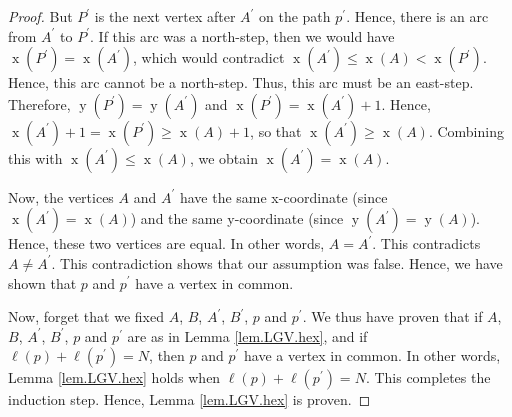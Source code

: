 \documentclass[reqno]{amsart}%
\newcommand{\0}{\phantom{c}}
\theoremstyle{plain}
\theoremstyle{definition}
\numberwithin{equation}{section}
\begin{document}
\begin{proof}
But $P^{\prime}$ is the next vertex after $A^{\prime}$ on the path $p^{\prime
}$. Hence, there is an arc from $A^{\prime}$ to $P^{\prime}$. If this arc was
a north-step, then we would have $\operatorname*{x}\left(  P^{\prime}\right)
=\operatorname*{x}\left(  A^{\prime}\right)  $, which would contradict
$\operatorname*{x}\left(  A^{\prime}\right)  \leq\operatorname*{x}\left(
A\right)  <\operatorname*{x}\left(  P^{\prime}\right)  $. Hence, this arc
cannot be a north-step. Thus, this arc must be an east-step. Therefore,
$\operatorname*{y}\left(  P^{\prime}\right)  =\operatorname*{y}\left(
A^{\prime}\right)  $ and $\operatorname*{x}\left(  P^{\prime}\right)
=\operatorname*{x}\left(  A^{\prime}\right)  +1$. Hence, $\operatorname*{x}%
\left(  A^{\prime}\right)  +1=\operatorname*{x}\left(  P^{\prime}\right)
\geq\operatorname*{x}\left(  A\right)  +1$, so that $\operatorname*{x}\left(
A^{\prime}\right)  \geq\operatorname*{x}\left(  A\right)  $. Combining this
with $\operatorname*{x}\left(  A^{\prime}\right)  \leq\operatorname*{x}\left(
A\right)  $, we obtain $\operatorname*{x}\left(  A^{\prime}\right)
=\operatorname*{x}\left(  A\right)  $.

Now, the vertices $A$ and $A^{\prime}$ have the same x-coordinate (since
$\operatorname*{x}\left(  A^{\prime}\right)  =\operatorname*{x}\left(
A\right)  $) and the same y-coordinate (since $\operatorname*{y}\left(
A^{\prime}\right)  =\operatorname*{y}\left(  A\right)  $). Hence, these two
vertices are equal. In other words, $A=A^{\prime}$. This contradicts $A\neq
A^{\prime}$. This contradiction shows that our assumption was false. Hence, we
have shown that $p$ and $p^{\prime}$ have a vertex in common.

Now, forget that we fixed $A$, $B$, $A^{\prime}$, $B^{\prime}$, $p$ and
$p^{\prime}$. We thus have proven that if $A$, $B$, $A^{\prime}$, $B^{\prime}%
$, $p$ and $p^{\prime}$ are as in Lemma \ref{lem.LGV.hex}, and if $\ell\left(
p\right)  +\ell\left(  p^{\prime}\right)  =N$, then $p$ and $p^{\prime}$ have
a vertex in common. In other words, Lemma \ref{lem.LGV.hex} holds when
$\ell\left(  p\right)  +\ell\left(  p^{\prime}\right)  =N$. This completes the
induction step. Hence, Lemma \ref{lem.LGV.hex} is proven.
\end{proof}
\end{document}
